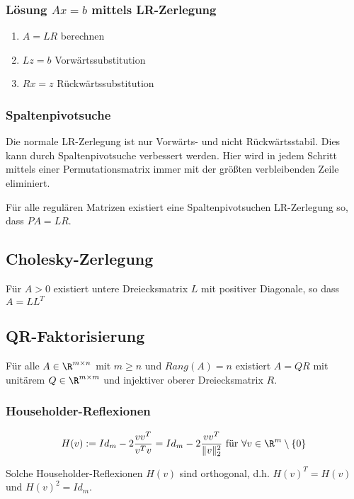 \subsubsection*{Lösung $Ax=b$ mittels LR-Zerlegung}

\begin{enumerate}
	\item $A=LR$ berechnen
	\item $Lz=b$ Vorwärtssubstitution
	\item $Rx=z$ Rückwärtssubstitution
\end{enumerate}

\subsubsection*{Spaltenpivotsuche}

Die normale LR-Zerlegung ist nur Vorwärts- und nicht Rückwärtsstabil. Dies kann durch Spaltenpivotsuche verbessert werden. Hier wird in jedem Schritt mittels einer Permutationsmatrix immer mit der größten verbleibenden Zeile eliminiert.

\vspace{1mm}

Für alle regulären Matrizen existiert eine Spaltenpivotsuchen LR-Zerlegung so, dass $PA=LR$.

\subsection*{Cholesky-Zerlegung}

Für $A > 0$ existiert untere Dreiecksmatrix $L$ mit positiver Diagonale, so dass $A = LL^T$

\subsection*{QR-Faktorisierung}

Für alle $A \in \R^{m \times n}$ mit $m \geq n$ und $Rang(A)=n$ existiert $A=QR$ mit unitärem $Q \in \R^{m \times m}$ und injektiver oberer Dreiecksmatrix $R$.

\subsubsection*{Householder-Reflexionen}

$$H(v) := Id_m - 2 \frac{vv^T}{v^Tv} = Id_m - 2 \frac{vv^T}{\|v\|_2^2} \text{ für } \forall v \in \R^m \setminus \{0\}$$

Solche Householder-Reflexionen $H(v)$ sind orthogonal, d.h. $H(v)^T=H(v)$ und $H(v)^2=Id_m$.

